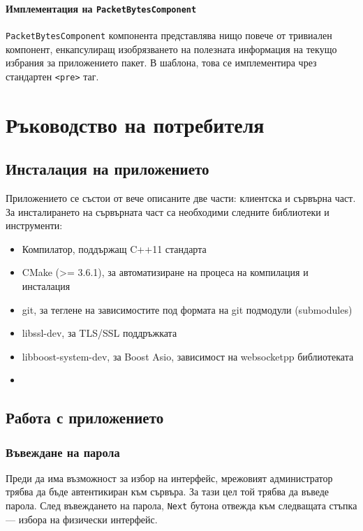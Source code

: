 \documentclass[12pt,a4paper,oneside]{book}
\begin{document}
\subsubsection{Имплементация на \texttt{PacketBytesComponent}}

\texttt{PacketBytesComponent} компонента представлява нищо повече от тривиален
компонент, енкапсулиращ изобрязването на полезната информация на текущо избрания
за приложението пакет. В шаблона, това се имплементира чрез стандартен
\texttt{<pre>} таг.

\chapter{Ръководство на потребителя}

\section{Инсталация на приложението}

Приложението се състои от вече описаните две части: клиентска и сървърна част.
За инсталирането на сървърната част са необходими следните библиотеки и
инструменти:

\begin{itemize}
  \item
    Компилатор, поддържащ C++11 стандарта
  \item
    CMake (>= 3.6.1), за автоматизиране на процеса на компилация и инсталация
  \item
    git, за теглене на зависимостите под формата на git подмодули (submodules)
  \item
    libssl-dev, за TLS/SSL поддръжката
  \item
    libboost-system-dev, за Boost Asio, зависимост на websocketpp библиотеката
\item
\end{itemize}


\section{Работа с приложението}

\subsection{Въвеждане на парола}

Преди да има възможност за избор на интерфейс, мрежовият администратор
трябва да бъде автентикиран към сървъра. За тази цел той трябва да въведе парола.
След въвеждането на парола, \texttt{Next} бутона отвежда към следващата стъпка ---
избора на физически интерфейс.
\end{document}
